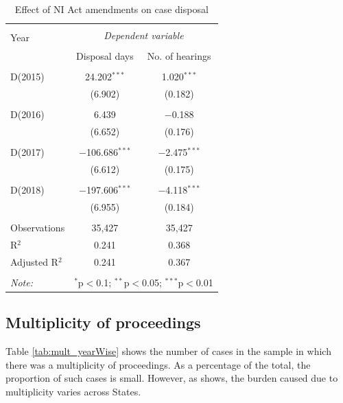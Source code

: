 \documentclass[12pt,a4paper]{article}
\begin{document}
\begin{table}
 \centering
 \caption{Effect of NI Act amendments on case
 disposal}\label{tab:amendments_effect}
 \footnotesize
 \begin{tabular}{@{\extracolsep{5pt}}lcc}
 \\[-1.8ex] 
 \hline \\[-1.8ex] 
 \multirow{2}{*}{Year} & \multicolumn{2}{c}{\textit{Dependent variable}} \\ 
 \cline{2-3} 
 \\[-1.8ex] & Disposal days & No. of hearings \\ 
 \hline \\[-1.8ex] 
 D(2015) & 24.202$^{***}$ & 1.020$^{***}$ \\ 
 & (6.902) & (0.182) \\ 
 & & \\ 
 D(2016) & 6.439 & $-$0.188 \\ 
 & (6.652) & (0.176) \\ 
 & & \\ 
 D(2017) & $-$106.686$^{***}$ & $-$2.475$^{***}$ \\ 
 & (6.612) & (0.175) \\ 
 & & \\ 
 D(2018) & $-$197.606$^{***}$ & $-$4.118$^{***}$ \\ 
 & (6.955) & (0.184) \\
 \hline \\[-1.8ex] 
 Observations & 35,427 & 35,427 \\ 
 R$^{2}$ & 0.241 & 0.368 \\ 
 Adjusted R$^{2}$ & 0.241 & 0.367 \\ 
 \hline \\[-1.8ex] 
 \textit{Note:} & \multicolumn{2}{r}{$^{*}$p$<$0.1; $^{**}$p$<$0.05; $^{***}$p$<$0.01} \\ 
 \end{tabular} 
\end{table}

\subsection{Multiplicity of proceedings}
\label{sec:mult-proc}

Table \ref{tab:mult_yearWise} shows the number of cases in the sample in which there was a multiplicity of proceedings. As a percentage of the total, the proportion of such cases is small. However, as  shows, the burden caused due to multiplicity varies across States.
\end{document}
